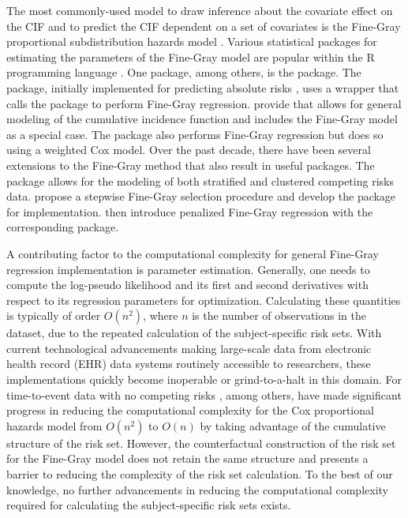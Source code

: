 The most commonly-used model to draw inference about the covariate effect on the CIF and to predict the CIF dependent on a set of covariates is the Fine-Gray proportional subdistribution hazards model \citep{fine1999proportional}. Various statistical packages for estimating the parameters of the Fine-Gray model are popular within the {R} programming language \citep{ihaka1996}. One package, among others, is the  \citep{cmprsk} package. The  \citep{riskRegression} package, initially implemented for predicting absolute risks \citep{gerds2012absolute}, uses a wrapper that calls the  package to perform Fine-Gray regression. \cite{scheike2011analyzing} provide  \citep{timereg} that allows for general modeling of the cumulative incidence function and includes the Fine-Gray model as a special case. The  package also performs Fine-Gray regression but does so using a weighted Cox \citep{cox1972regression} model. Over the past decade, there have been several extensions to the Fine-Gray method that also result in useful packages. The  \citep{crrSC} package allows for the modeling of both stratified \citep{zhou2011competing} and clustered \citep{zhou2012competing} competing risks data. \cite{kuk2013model} propose a  stepwise Fine-Gray selection procedure and develop the  \citep{crrstep} package for implementation. \cite{fu2017penalized} then introduce penalized Fine-Gray regression with the corresponding  \citep{crrp} package. 

A contributing factor to the computational complexity for general Fine-Gray regression implementation is parameter estimation. Generally, one needs to compute the log-pseudo likelihood and its first and second derivatives with respect to its regression parameters for optimization. Calculating these quantities is typically of order $O(n^2)$, where $n$ is the number of observations in the dataset, due to the repeated calculation of the subject-specific risk sets. With current technological advancements making large-scale data from  electronic health record (EHR) data systems routinely accessible to researchers, these implementations quickly become inoperable or grind-to-a-halt in this domain. For time-to-event data with no competing risks \cite{mittal2013high}, among others, have made significant progress in reducing the computational complexity for the Cox proportional hazards model from $O(n^2)$ to $O(n)$ by taking advantage of the cumulative structure of the risk set. However, the counterfactual construction of the risk set for the Fine-Gray model does not retain the same structure and presents a barrier to reducing the complexity of the risk set calculation. To the best of our knowledge, no further advancements in reducing the computational complexity required for calculating the subject-specific risk sets exists. 

